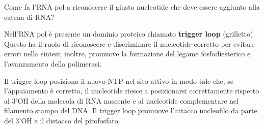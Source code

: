 \documentclass[]{article}
\begin{document}
Come fa l'RNA pol a riconoscere il giusto nucleotide che deve essere
aggiunto alla catena di RNA?

Nell'RNA pol è presente un dominio proteico chiamato \textbf{trigger
loop} (grilletto). Questo ha il ruolo di riconoscere e discriminare il
nucleotide corretto per evitare errori nella sintesi; inoltre, promuove
la formazione del legame fosfodiesterico e l'avanzamento della
polimerasi.

Il trigger loop posiziona il nuovo NTP nel sito attivo in modo tale che,
se l'appaiamento è corretto, il nucleotide riesce a posizionarsi
correttamente rispetto al 3'OH della molecola di RNA nascente e al
nucleotide complementare nel filamento stampo del DNA. Il trigger loop
promuove l'attacco nucleofilo da parte del 3'OH e il distacco del
pirofosfato.
\end{document}
